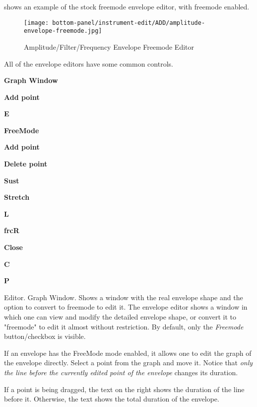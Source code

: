    shows an example of the stock freemode envelope editor, with
   freemode enabled.

\begin{figure}[H]
   \centering 
   \texttt{[image: bottom-panel/instrument-edit/ADD/amplitude-envelope-freemode.jpg]}
   \caption{Amplitude/Filter/Frequency Envelope Freemode Editor}
   \label{fig:amplitude_envelope_freemode}
\end{figure}

   All of the envelope editors have some common controls.

   \begin{enumber}
      \item \textbf{Graph Window}
      \item \textbf{Add point}
      \item \textbf{E}
      \item \textbf{FreeMode}
      \item \textbf{Add point}
      \item \textbf{Delete point}
      \item \textbf{Sust}
      \item \textbf{Stretch}
      \item \textbf{L}
      \item \textbf{frcR}
      \item \textbf{Close}
      \item \textbf{C}
      \item \textbf{P}
   \end{enumber}

   \setcounter{ItemCounter}{0}      %

   Editor.  Graph Window.
   Shows a window with the real envelope shape and the option to convert to
   freemode to edit it.
   The envelope editor shows a window in which one can view and modify the
   detailed envelope shape, or convert it to "freemode" to edit it almost
   without restriction.
   By default, only the \textsl{Freemode} button/checkbox is visible.

   If an envelope has the FreeMode mode enabled, it allows one to edit the
   graph of the envelope directly. Select a point from the graph and move it.
   Notice that \textsl{only the line before the currently edited point of the
   envelope} changes its duration.

   If a point is being dragged, the text on the right shows the duration of
   the line before it. Otherwise, the text shows the total duration of the
   envelope. 


